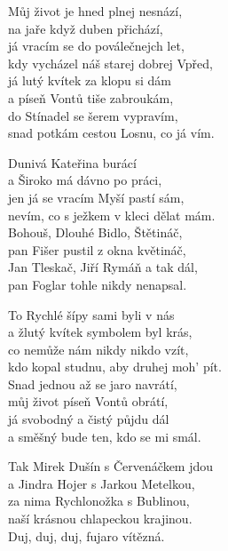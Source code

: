 
\ve{}
Můj život je hned plnej nesnází,\\
na jaře když duben přichází,\\
já vracím se do poválečnejch let,\\
kdy vycházel náš starej dobrej Vpřed,\\
já lutý kvítek za klopu si dám\\
a píseň Vontů tiše zabroukám,\\
do Stínadel se šerem vypravím, \\
snad potkám cestou Losnu, co já vím.

\ve{}
Dunivá Kateřina burácí\\
a Široko má dávno po práci,\\
jen já se vracím Myší pastí sám,\\
nevím, co s ježkem v kleci dělat mám.\\
Bohouš, Dlouhé Bidlo, Štětináč,\\
pan Fišer pustil z okna květináč,\\
Jan Tleskač, Jiří Rymáň a tak dál,\\
pan Foglar tohle nikdy nenapsal.

\ve{}
To Rychlé šípy sami byli v nás\\
a žlutý kvítek symbolem byl krás,\\
co nemůže nám nikdy nikdo vzít,\\
kdo kopal studnu, aby druhej moh’ pít.\\
Snad jednou až se jaro navrátí,\\
můj život píseň Vontů obrátí,\\
já svobodný a čistý půjdu dál\\
a směšný bude ten, kdo se mi smál.

\ve{}
Tak Mirek Dušín s Červenáčkem jdou\\
a Jindra Hojer s Jarkou Metelkou,\\
za nima Rychlonožka s Bublinou,\\
naší krásnou chlapeckou krajinou.\\
Duj, duj, duj, fujaro vítězná.

\esong